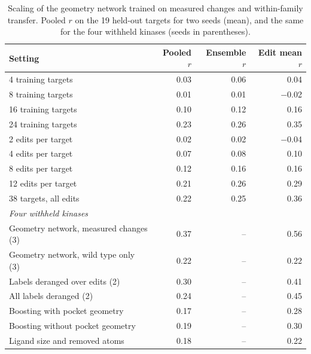 \begin{table}[h]
\caption{Scaling of the geometry network trained on measured changes and within-family transfer. Pooled $r$ on the 19 held-out targets for two seeds (mean), and the same for the four withheld kinases (seeds in parentheses).}
\label{tab:si_scale}
\begin{tabular}{lrrr}
\toprule
Setting & Pooled $r$ & Ensemble $r$ & Edit mean $r$ \\
\midrule
4 training targets & 0.03 & 0.06 & 0.04 \\
8 training targets & 0.01 & 0.01 & $-$0.02 \\
16 training targets & 0.10 & 0.12 & 0.16 \\
24 training targets & 0.23 & 0.26 & 0.35 \\
2 edits per target & 0.02 & 0.02 & $-$0.04 \\
4 edits per target & 0.07 & 0.08 & 0.10 \\
8 edits per target & 0.12 & 0.16 & 0.16 \\
12 edits per target & 0.21 & 0.26 & 0.29 \\
38 targets, all edits & 0.22 & 0.25 & 0.36 \\
\midrule
\multicolumn{4}{l}{\emph{Four withheld kinases}} \\
Geometry network, measured changes (3) & 0.37 & -- & 0.56 \\
Geometry network, wild type only (3) & 0.22 & -- & 0.22 \\
Labels deranged over edits (2) & 0.30 & -- & 0.41 \\
All labels deranged (2) & 0.24 & -- & 0.45 \\
Boosting with pocket geometry & 0.17 & -- & 0.28 \\
Boosting without pocket geometry & 0.19 & -- & 0.30 \\
Ligand size and removed atoms & 0.18 & -- & 0.22 \\
\bottomrule
\end{tabular}
\end{table}

